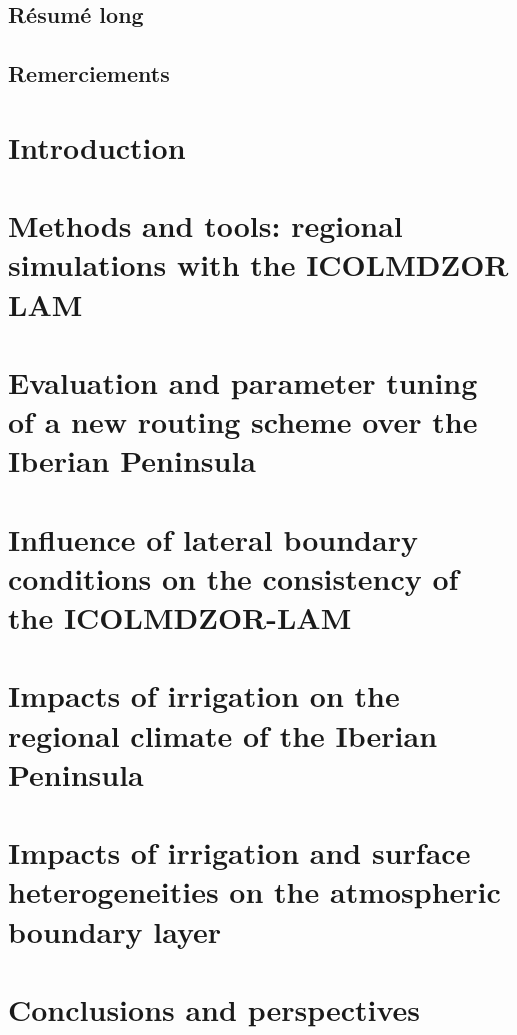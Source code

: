 \documentclass{report}
\begin{document}
\clearpage

\section*{Résumé long}
\section*{Remerciements}

\clearpage
\dominitoc
\renewcommand*\contentsname{Contents}
\tableofcontents
\newpage

\chapter{Introduction}
\label{chap:introduction}
\minitoc
\pagebreak


\chapter{Methods and tools: regional simulations with the ICOLMDZOR LAM}
\label{chap:methods}
\minitoc
\pagebreak


\chapter{Evaluation and parameter tuning of a new routing scheme over the Iberian Peninsula}
\label{chap:routing}
\minitoc
\pagebreak


\chapter{Influence of lateral boundary conditions on the consistency of the ICOLMDZOR-LAM}
\label{chap:forcing}
\minitoc
\pagebreak


\chapter{Impacts of irrigation on the regional climate of the Iberian Peninsula}
\label{chap:monthly}
\minitoc
\pagebreak


\chapter{Impacts of irrigation and surface heterogeneities on the atmospheric boundary layer}
\label{chap:liaise}
\minitoc
\pagebreak


\chapter{Conclusions and perspectives}
\label{chap:conclusion}




\newpage

\printbibliography

\listoffigures
\newpage
\listoftables
\end{document}
